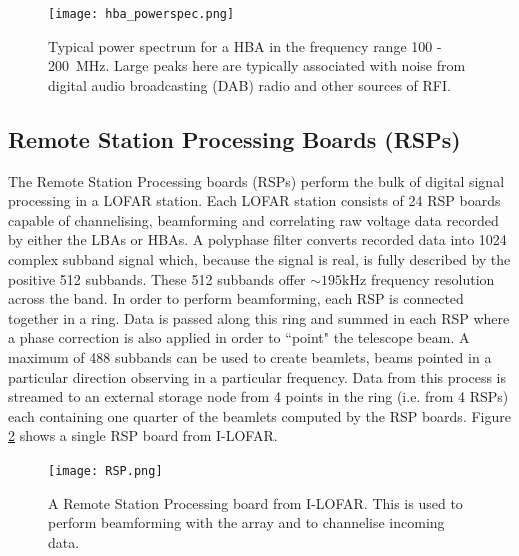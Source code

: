 \begin{figure}[ht]
    \centering
    \texttt{[image: hba\_powerspec.png]}
    \caption[Typical power spectrum for a HBA 100 - 200~MHz.]{Typical power spectrum for a HBA in the frequency range 100 - 200~MHz. Large peaks here are typically associated with noise from digital audio broadcasting (DAB) radio and other sources of RFI.}
    \label{fig:HBA_power_spec}
\end{figure}

\subsection{Remote Station Processing Boards (RSPs)}
\label{sec:rsp}
The Remote Station Processing boards (RSPs) perform the bulk of digital signal processing in a LOFAR station. Each LOFAR station consists of 24 RSP boards capable of channelising, beamforming and correlating raw voltage data recorded by either the LBAs or HBAs. A polyphase filter converts recorded data into 1024 complex subband signal which, because the signal is real, is fully described by the positive 512 subbands. These 512 subbands offer $\sim 195$kHz frequency resolution across the band. In order to perform beamforming, each RSP is connected together in a ring. Data is passed along this ring and summed in each RSP where a phase correction is also applied in order to ``point" the telescope beam. A maximum of 488 subbands can be used to create beamlets, beams pointed in a particular direction observing in a particular frequency. Data from this process is streamed to an external storage node from 4 points in the ring (i.e. from 4 RSPs) each containing one quarter of the beamlets computed by the RSP boards. Figure \ref{fig:RSP} shows a single RSP board from I-LOFAR.

\begin{figure}[ht]
\centering
\texttt{[image: RSP.png]}
\caption[A Remote Station Processing board.]{A Remote Station Processing board from I-LOFAR. This is used to perform beamforming with the array and to channelise incoming data.}
\label{fig:RSP}
\end{figure}

